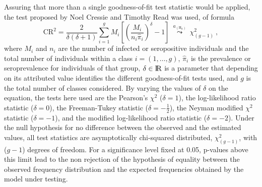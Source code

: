 Assuring that more than a single goodness-of-fit test statistic would be applied, the test proposed by Noel Cressie and Timothy Read \cite{cressie1984multinomial} was used, of formula
%
\begin{equation}
    \label{eq:cressie.read}
    \text{CR}^2 = \frac{2}{\delta(\delta+1)} \sum_{i=1}^g M_i \left[ \left(\frac{M_i}{n_i\hat{\pi}_i}\right)^\delta-1\right]\ \overset{a_{\left(\text{H}_0\right)}}{\leadsto}\    \chi_{(g-1)}^{2}\ ,
\end{equation}
%
\noindent
where $M_i$ and $n_i$ are the number of infected or seropositive individuals and the total number of individuals within a class $i=(1,\dots,g)$, $\hat{\pi}_i$ is the prevalence or seroprevalence for individuals of that group, $\delta \in \rm I\!R$ is a parameter that depending on its attributed value identifies the different goodness-of-fit tests used, and $g$ is the total number of classes considered.
By varying the values of $\delta$ on the equation, the tests here used are the Pearson's $\chi^2$ ($\delta=1$), the log-likelihood ratio statistic ($\delta=0$), the Freeman-Tukey statistic ($\delta=\textstyle-\frac{1}{2}$), the Neyman modified $\chi^2$ statistic ($\delta=-1$), and the modified log-likelihood ratio statistic ($\delta=-2$).
Under the null hypothesis for no difference between the observed and the estimated values, all test statistics are asymptotically chi-squared distributed, $\chi_{(g-1)}^{2}$, with ($g-1$) degrees of freedom.
For a significance level fixed at 0.05, p-values above this limit lead to the non rejection of the hypothesis of equality between the observed frequency distribution and the expected frequencies obtained by the model under testing.
%
